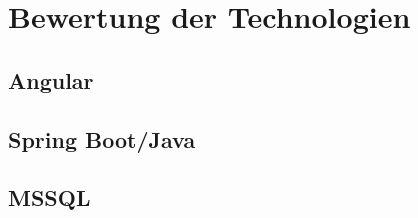 \chapter{Bewertung der Technologien}\label{ch:experiments}
\section{Angular}
\section{Spring Boot/Java}
\section{MSSQL}
\Blindtext
